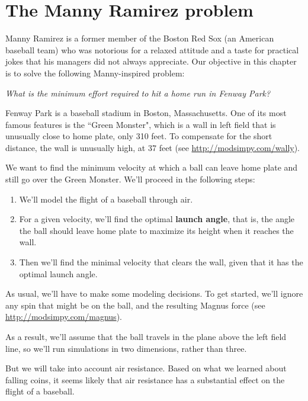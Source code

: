 \documentclass[12pt]{book}
\theoremstyle{exercise}
\begin{document}
\section{The Manny Ramirez problem}
\label{manny}

Manny Ramirez is a former member of the Boston Red Sox (an American baseball team) who was notorious for a relaxed attitude and a taste for practical jokes that his managers did not always appreciate.  Our objective in this chapter is to solve the following Manny-inspired problem:

{\it What is the minimum effort required to hit a home run in Fenway Park?}

Fenway Park is a baseball stadium in Boston, Massachusetts.  One of its most famous features is the ``Green Monster", which is a wall in left field that is unusually close to home plate, only 310 feet.  To compensate for the short distance, the wall is unusually high, at 37 feet (see \url{http://modsimpy.com/wally}).

We want to find the minimum velocity at which a ball can leave home plate and still go over the Green Monster.  We'll proceed in the following steps:

\begin{enumerate}

\item We'll model the flight of a baseball through air.

\item For a given velocity, we'll find the optimal {\bf launch angle}, that is, the angle the ball should leave home plate to maximize its height when it reaches the wall.

\item Then we'll find the minimal velocity that clears the wall, given that it has the optimal launch angle.

\end{enumerate}

As usual, we'll have to make some modeling decisions.  To get started, we'll ignore any spin that might be on the ball, and the resulting Magnus force (see \url{http://modsimpy.com/magnus}).

As a result, we'll assume that the ball travels in the plane above the left field line, so we'll run simulations in two dimensions, rather than three.

But we will take into account air resistance.  Based on what we learned about falling coins, it seems likely that air resistance has a substantial effect on the flight of a baseball.
\end{document}
